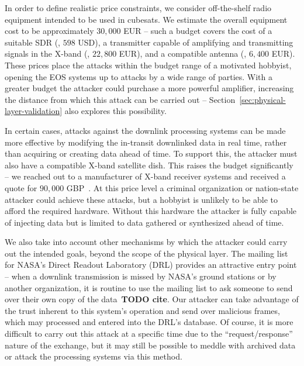 In order to define realistic price constraints, we consider off-the-shelf radio equipment intended to be used in cubesats.
We estimate the overall equipment cost to be approximately $30,000$ EUR -- such a budget covers the cost of a suitable SDR (\cite{limeSdr,limeCompanion}, $598$ USD), a transmitter capable of amplifying and transmitting signals in the X-band (\cite{endurosat:xbandtransmitter}, $22,800$ EUR), and a compatible antenna (\cite{endurosat:xbandantenna}, $6,400$ EUR).
These prices place the attacks within the budget range of a motivated hobbyist, opening the EOS systems up to attacks by a wide range of parties.
With a greater budget the attacker could purchase a more powerful amplifier, increasing the distance from which this attack can be carried out -- Section~\ref{sec:physical-layer-validation} also explores this possibility.

In certain cases, attacks against the downlink processing systems can be made more effective by modifying the in-transit downlinked data in real time, rather than acquiring or creating data ahead of time.
To support this, the attacker must also have a compatible X-band satellite dish.
This raises the budget significantly -- we reached out to a manufacturer of X-band receiver systems and received a quote for $90,000$ GBP~\cite{dartcomsystemsltdXBandOverview2021}.
At this price level a criminal organization or nation-state attacker could achieve these attacks, but a hobbyist is unlikely to be able to afford the required hardware.
Without this hardware the attacker is fully capable of injecting data but is limited to data gathered or synthesized ahead of time.

We also take into account other mechanisms by which the attacker could carry out the intended goals, beyond the scope of the physical layer.
The mailing list for NASA's Direct Readout Laboratory (DRL) provides an attractive entry point -- when a downlink transmission is missed by NASA's ground stations or by another organization, it is routine to use the mailing list to ask someone to send over their own copy of the data~\textbf{TODO cite}. %
Our attacker can take advantage of the trust inherent to this system's operation and send over malicious frames, which may processed and entered into the DRL's database.
Of course, it is more difficult to carry out this attack at a specific time due to the ``request/response'' nature of the exchange, but it may still be possible to meddle with archived data or attack the processing systems via this method.
